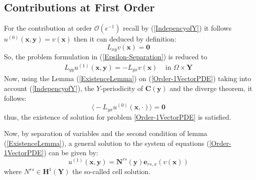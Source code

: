 \subsection{Contributions at First Order}
For the contribution at order $\mathcal{O}(\epsilon^{-1})$ recall by (\ref{IndepencyofY}) it follows $u^{(0)}(\mathbf{x},\mathbf{y}) = v(\mathbf{x})$ then it can deduced by definition:
\begin{equation*}
    L_{xy} v(\mathbf{x}) = \mathbf{0}
\end{equation*}
So, the problem formulation in (\ref{Epsilon-Separation}) is reduced to
\begin{equation}
    \label{Order-1VectorPDE}
    \begin{array}{cc}
        L_{yy} u^{(1)}(\mathbf{x},\mathbf{y}) = - L_{yx} v(\mathbf{x}) & \text{ in } \Omega \times \mathbf{Y}
    \end{array}
\end{equation}
Now, using the Lemma (\ref{ExistenceLemma}) on (\ref{Order-1VectorPDE}) taking into account (\ref{IndepencyofY}), the $Y$-periodicity of $\mathbf{C}(\mathbf{y})$ and the diverge theorem, it follows:
\begin{equation*}
    \big\langle - L_{yx} u^{(0)}(\mathbf{x}, \cdot) \big\rangle = \mathbf{0}
\end{equation*}
thus, the existence of solution for problem \ref{Order-1VectorPDE} is satisfied.

Now, by separation of variables and the second condition of lemma (\ref{ExistenceLemma}), a general solution to the system of equations (\ref{Order-1VectorPDE}) can be given by:
\begin{equation}
    \label{Order-1Ansatz}
    u^{(1)}(\mathbf{x},\mathbf{y}) = \mathbf{N}^{rs}(\mathbf{y}) \mathbf{e}_{rs,x}(v(\mathbf{x})) 
\end{equation}
where $N^{rs} \in \mathbf{H}^1 (\mathbf{Y})$ the so-called cell solution.

